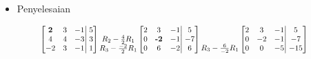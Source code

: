 \documentclass[pdflatex,compress,mathserif]{beamer}
\newcommand*{\Scale}[2][4]{\scalebox{#1}{$#2$}}%
\begin{document}
\begin{frame}
	\begin{itemize}
		\item Penyelesaian
	\end{itemize}
	\begin{align*}
	\Scale[0.8]{
		\left[
		\begin{matrix}
		\textbf{2} & 3 & -1 \\
		4 & 4 & -3 \\
		-2 & 3 & -1
		\end{matrix}
		\right|
		\left.
		\begin{matrix}
		5 \\
		3 \\
		1
		\end{matrix}
		\right]
		\begin{matrix}
		 \\
		R_2 - \frac{4}{2}R_1 \\
		R_3 - \frac{-2}{2}R_1
		\end{matrix}
		\left[
		\begin{matrix}
		2 & 3 & -1 \\
		0 & \textbf{-2} & -1 \\
		0 & 6 & -2
		\end{matrix}
		\right|
		\left.
		\begin{matrix}
		5 \\
		-7 \\
		6
		\end{matrix}
		\right]
		\begin{matrix}
		\\
		\\
		R_3 - \frac{6}{-2}R_1
		\end{matrix}
		\left[
		\begin{matrix}
		2 & 3 & -1 \\
		0 & -2 & -1 \\
		0 & 0 & -5
		\end{matrix}
		\right|
		\left.
		\begin{matrix}
		5 \\
		-7 \\
		-15
		\end{matrix}
		\right]}
	\end{align*}
\end{frame}
\end{document}
